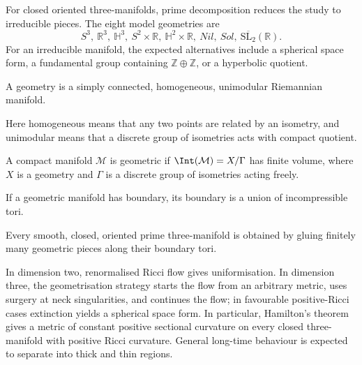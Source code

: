 For closed oriented three-manifolds, prime decomposition reduces the study to
irreducible pieces. The eight model geometries are
\[
S^3,\ \mathbb R^3,\ \mathbb H^3,\ S^2\times\mathbb R,
\ \mathbb H^2\times\mathbb R,\ Nil,\ Sol,
\ \overline{\mathrm{SL}_2}(\mathbb R).
\]
For an irreducible manifold, the expected alternatives include a spherical
space form, a fundamental group containing $\mathbb Z\oplus\mathbb Z$, or a
hyperbolic quotient.

\begin{definition}
\label{topping-intro-geometry}
A geometry is a simply connected, homogeneous, unimodular Riemannian
manifold.
\end{definition}

Here homogeneous means that any two points are related by an isometry, and
unimodular means that a discrete group of isometries acts with compact
quotient.

\begin{definition}
\label{topping-intro-geometric-manifold}
A compact manifold $\mathcal M$ is geometric if
$\Int(\mathcal M)=X/\Gamma$ has finite volume, where $X$ is a geometry and
$\Gamma$ is a discrete group of isometries acting freely.
\end{definition}

If a geometric manifold has boundary, its boundary is a union of
incompressible tori.

\begin{conjecture}
\label{topping-intro-thurston-geometrization}
Every smooth, closed, oriented prime three-manifold is obtained by gluing
finitely many geometric pieces along their boundary tori.
\end{conjecture}

In dimension two, renormalised Ricci flow gives uniformisation. In dimension
three, the geometrisation strategy starts the flow from an arbitrary metric,
uses surgery at neck singularities, and continues the flow; in favourable
positive-Ricci cases extinction yields a spherical space form. In particular,
Hamilton's theorem gives a metric of constant positive sectional curvature on
every closed three-manifold with positive Ricci curvature. General long-time
behaviour is expected to separate into thick and thin regions.
